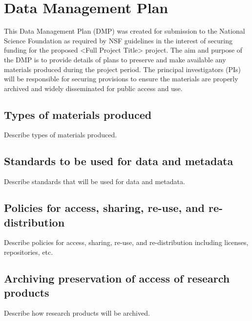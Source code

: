 \section{Data Management Plan}

This Data Management Plan (DMP) was created for submission to the National Science Foundation as required by NSF guidelines in the interest of securing funding for the proposed <Full Project Title> project. The aim and purpose of the DMP is to provide details of plans to preserve and make available any materials produced during the project period. The principal investigators (PIs) will be responsible for securing provisions to ensure the materials are properly archived and widely disseminated for public access and use. 

\subsection{Types of materials produced}
Describe types of materials produced.


\subsection{Standards to be used for data and metadata}

Describe standards that will be used for data and metadata.

\subsection{Policies for access, sharing, re-use, and re-distribution}
Describe policies for access, sharing, re-use, and re-distribution including licenses, repositories, etc.

\subsection{Archiving preservation of access of research products}

Describe how research products will be archived.